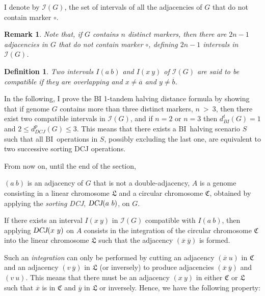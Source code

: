 \documentclass[11pt,final,twoside,nofrench]{thlifl}
\newcommand{\fst}[1]{ \ensuremath{#1} }
\newcommand{\snd}[1]{ \ensuremath{\overline{#1}} }
\newcommand\aff[2]{\ensuremath{(\fst{#1}~\fst{#2})}}
\newcommand\asf[2]{\ensuremath{(\snd{#1}~\fst{#2})}}
\newcommand\afs[2]{\ensuremath{(\fst{#1}~\snd{#2})}}
\newcommand\ass[2]{\ensuremath{(\snd{#1}~\snd{#2})}}
\def\BI{\ensuremath{\mbox{BI}}}
\def\DCJ{\ensuremath{\mbox{\sl DCJ}}}
\newtheorem{definition}{Definition}
\newtheorem{remark}{Remark}
\begin{document}
I denote by $\mathcal{I}(G)$, the set of intervals of all the adjacencies of $G$ that do not contain marker $\circ$.

\begin{remark}
Note that, if $G$ contains $n$ distinct markers, then there are $2n-1$ adjacencies in $G$ that do not contain marker $\circ$,  defining $2n-1$ intervals in  $\mathcal{I}(G)$.
\label{maxEdges}
\end{remark}

\begin{definition}
Two  intervals $I\aff{a}{b}$ and $I\aff{x}{y}$ of $\mathcal{I}(G)$ are said to be \emph{compatible} if they are overlapping and  $x \neq \snd{a}$ and $y \neq \snd{b}$.
\end{definition}

In the following, I prove the BI 1-tandem halving distance formula by showing that if genome $G$ contains more than three distinct markers, $n~>~3$,  then there exist two compatible intervals in $\mathcal{I}(G)$, and if $n=2$ or $n=3$ then $d^t_{BI}(G)=1$ and $2 \leq d^p_{DCJ}(G) \leq 3$.
This means that there exists a \BI ~halving scenario $S$ such that all \BI ~operations in $S$, possibly excluding the last one, are equivalent to two successive sorting DCJ operations.

From now on, until the end of the section,

$\aff{a}{b}$ is an adjacency of $G$ that is not a double-adjacency, $A$ is a genome consisting in a linear chromosome $\mathfrak{L}$ and a circular chromosome $\mathfrak{C}$, obtained by applying the \emph{sorting DCJ}, $\DCJ\aff{a}{b}$, on $G$.

If there exists an interval $I\aff{x}{y}$ in $\mathcal{I}(G)$ compatible with  $I\aff{a}{b}$, then applying $\DCJ\aff{x}{y}$ on $A$ consists in the integration of the circular chromosome $\mathfrak{C}$ into the linear chromosome $\mathfrak{L}$ such that the adjacency $\ass{x}{y}$ is formed.

Such an \emph{integration} can only be performed by cutting an adjacency $\asf{x}{u}$ in $\mathfrak{C}$ and an adjacency $\afs{v}{y}$ in $\mathfrak{L}$ (or inversely) to produce adjacencies $\ass{x}{y}$ and $\aff{v}{u}$.  This means that there must be an adjacency \aff{x}{y} in either $\mathfrak{C}$ or $\mathfrak{L}$ such that $\snd{x}$ is in $\mathfrak{C}$ and $\snd{y}$ in $\mathfrak{L}$ or inversely.
Hence, we have the following property:
\end{document}
